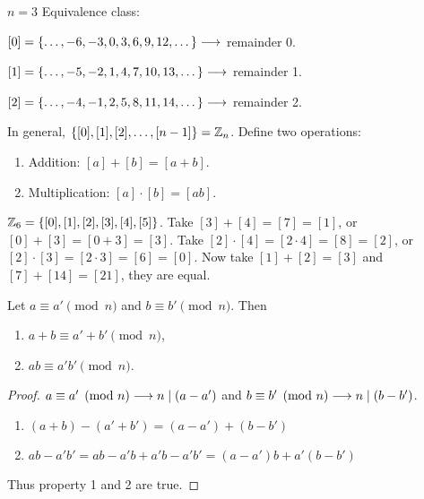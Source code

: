 \documentclass[]{article}
\begin{document}
\begin{example}
	\ul{$n=3$} Equivalence class:

	$[0] = \{ \dots,-6,-3,0,3,6,9,12,\dots \} \longrightarrow $ remainder 0.

	$[1] = \{ \dots,-5,-2,1,4,7,10,13,\dots \} \longrightarrow $ remainder 1.

	$[2] = \{ \dots, -4,-1,2,5,8,11,14,\dots \} \longrightarrow $ remainder 2.
\end{example}
In general, $\{[0],[1],[2],\dots,[n-1]\} = \mathbb{Z}_n$.
Define two operations:
\begin{enumerate}
	\item Addition: $[a]+[b] = [a+b]$.
	\item Multiplication: $[a]\cdot[b] = [ab]$.
	
\end{enumerate}
\begin{example}
	$\mathbb{Z}_6 = \{[0],[1],[2],[3],[4],[5]\}$. Take $[3]+[4] = [7]=[1]$, or $[0]+[3] = [0+3] = [3]$. Take $[2]\cdot[4] = [2\cdot 4] = [8] = [2]$, or $[2]\cdot[3] = [2\cdot 3] = [6] = [0]$. Now take $[1]+[2] = [3]$ and $[7]+[14]=[21]$, they are equal.
\end{example}
\begin{lemma}
	Let $a\equiv a'\pmod n$ and $b\equiv b'\pmod n$. Then
	\begin{enumerate}
		\item $a+b \equiv a'+b'\pmod n$,
		\item $ab \equiv a'b'\pmod n$.
	\end{enumerate}
\end{lemma}
\begin{proof}
	$a\equiv a'\pmod n \longrightarrow n\mid (a-a')$ and $b\equiv b'\pmod n \longrightarrow n\mid(b-b')$.
	\begin{enumerate}
		\item $(a+b) - (a'+b') = (a-a') + (b-b')$
		\item $ab-a'b' = ab-a'b+a'b-a'b' = (a-a')b + a'(b-b')$
	\end{enumerate}
	Thus property 1 and 2 are true.
\end{proof}
\end{document}
